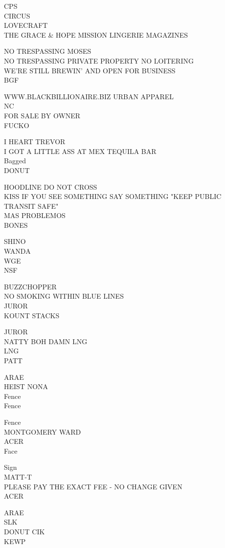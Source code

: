 \documentclass[10pt,letterpaper]{article}
\begin{document}
CPS\\
CIRCUS\\
LOVECRAFT\\
THE GRACE \& HOPE MISSION LINGERIE MAGAZINES

NO TRESPASSING MOSES\\
NO TRESPASSING PRIVATE PROPERTY NO LOITERING\\
WE'RE STILL BREWIN' AND OPEN FOR BUSINESS\\
BGF

WWW.BLACKBILLIONAIRE.BIZ URBAN APPAREL\\
NC\\
FOR SALE BY OWNER\\
FUCKO

I HEART TREVOR\\
I GOT A LITTLE ASS AT MEX TEQUILA BAR\\
Bagged\\
DONUT

HOODLINE DO NOT CROSS\\
KISS IF YOU SEE SOMETHING SAY SOMETHING "KEEP PUBLIC TRANSIT SAFE"\\
MAS PROBLEMOS\\
BONES

SHINO\\
WANDA\\
WGE\\
NSF

BUZZCHOPPER\\
NO SMOKING WITHIN BLUE LINES\\
JUROR\\
KOUNT STACKS

JUROR\\
NATTY BOH DAMN LNG\\
LNG\\
PATT

ARAE\\
HEIST NONA\\
Fence\\
Fence

Fence\\
MONTGOMERY WARD\\
ACER\\
Face

Sign\\
MATT{-}T\\
PLEASE PAY THE EXACT FEE {-} NO CHANGE GIVEN\\
ACER

ARAE\\
SLK\\
DONUT CIK\\
KEWP
\end{document}

